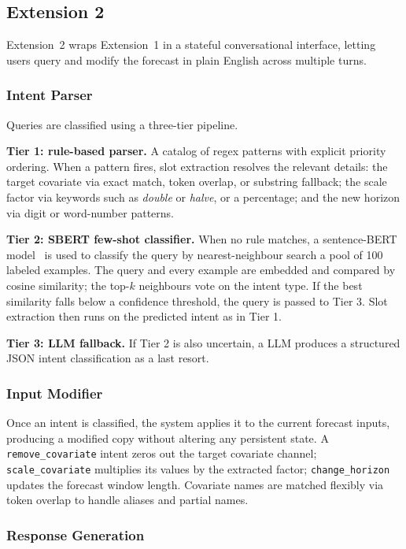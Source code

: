 \documentclass[conference]{IEEEtran}
\begin{document}
\subsection{Extension 2}

Extension~2 wraps Extension~1 in a stateful conversational interface, letting users query and modify the forecast in plain English across multiple turns.

\subsubsection{Intent Parser}

Queries are classified using a three-tier pipeline.

\textbf{Tier 1: rule-based parser.}
A catalog of regex patterns with explicit priority ordering. When a pattern fires, slot extraction resolves the relevant details: the target covariate via exact match, token overlap, or substring fallback; the scale factor via keywords such as \textit{double} or \textit{halve}, or a percentage; and the new horizon via digit or word-number patterns.

\textbf{Tier 2: SBERT few-shot classifier.}
When no rule matches, a sentence-BERT model~\cite{reimers2019sbert} is used to classify the query by nearest-neighbour search a pool of 100 labeled examples. The query and every example are embedded and compared by cosine similarity; the top-$k$ neighbours vote on the intent type. If the best similarity falls below a confidence threshold, the query is passed to Tier 3. Slot extraction then runs on the predicted intent as in Tier 1. 

\textbf{Tier 3: LLM fallback.}
If Tier 2 is also uncertain, a LLM produces a structured JSON intent classification as a last resort. 

\subsubsection{Input Modifier}

Once an intent is classified, the system applies it to the current forecast inputs, producing a modified copy without altering any persistent state. A \texttt{remove\_covariate} intent zeros out the target covariate channel; \texttt{scale\_covariate} multiplies its values by the extracted factor; \texttt{change\_horizon} updates the forecast window length. Covariate names are matched flexibly via token overlap to handle aliases and partial names.


\subsubsection{Response Generation}
\end{document}
